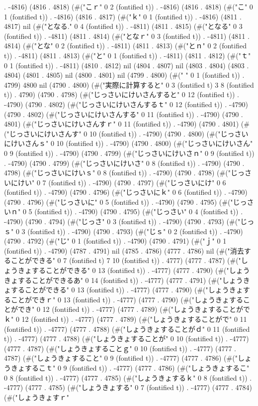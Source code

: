 . -4816) (4816 . 4818) (#("こｒ" 0 2 (fontified t)) . -4816) (4816 . 4818) (#("こ" 0 1 (fontified t)) . -4816) (4816 . 4817) (#("ｋ" 0 1 (fontified t)) . -4816) (4811 . 4817) nil (#("となる." 0 4 (fontified t)) . -4811) (4811 . 4815) (#("となる" 0 3 (fontified t)) . -4811) (4811 . 4814) (#("となｒ" 0 3 (fontified t)) . -4811) (4811 . 4814) (#("とな" 0 2 (fontified t)) . -4811) (4811 . 4813) (#("とｎ" 0 2 (fontified t)) . -4811) (4811 . 4813) (#("と" 0 1 (fontified t)) . -4811) (4811 . 4812) (#("ｔ" 0 1 (fontified t)) . -4811) (4810 . 4812) nil (4804 . 4807) nil (4803 . 4804) (4803 . 4804) (4801 . 4805) nil (4800 . 4801) nil (4799 . 4800) (#(" " 0 1 (fontified t)) . 4799) 4800 nil (4790 . 4800) (#("実際に計算すると" 0 3 (fontified t) 3 8 (fontified t)) . 4790) (4790 . 4798) (#("じっさいにけいさんすると" 0 12 (fontified t)) . -4790) (4790 . 4802) (#("じっさいにけいさんするｔ" 0 12 (fontified t)) . -4790) (4790 . 4802) (#("じっさいにけいさんする" 0 11 (fontified t)) . -4790) (4790 . 4801) (#("じっさいにけいさんすｒ" 0 11 (fontified t)) . -4790) (4790 . 4801) (#("じっさいにけいさんす" 0 10 (fontified t)) . -4790) (4790 . 4800) (#("じっさいにけいさんｓ" 0 10 (fontified t)) . -4790) (4790 . 4800) (#("じっさいにけいさん" 0 9 (fontified t)) . -4790) (4790 . 4799) (#("じっさいにけいさｎ" 0 9 (fontified t)) . -4790) (4790 . 4799) (#("じっさいにけいさ" 0 8 (fontified t)) . -4790) (4790 . 4798) (#("じっさいにけいｓ" 0 8 (fontified t)) . -4790) (4790 . 4798) (#("じっさいにけい" 0 7 (fontified t)) . -4790) (4790 . 4797) (#("じっさいにけ" 0 6 (fontified t)) . -4790) (4790 . 4796) (#("じっさいにｋ" 0 6 (fontified t)) . -4790) (4790 . 4796) (#("じっさいに" 0 5 (fontified t)) . -4790) (4790 . 4795) (#("じっさいｎ" 0 5 (fontified t)) . -4790) (4790 . 4795) (#("じっさい" 0 4 (fontified t)) . -4790) (4790 . 4794) (#("じっさ" 0 3 (fontified t)) . -4790) (4790 . 4793) (#("じっｓ" 0 3 (fontified t)) . -4790) (4790 . 4793) (#("じｓ" 0 2 (fontified t)) . -4790) (4790 . 4792) (#("じ" 0 1 (fontified t)) . -4790) (4790 . 4791) (#("ｊ" 0 1 (fontified t)) . -4790) (4787 . 4791) nil (4785 . 4786) (4777 . 4786) nil (#("消去することができる" 0 7 (fontified t) 7 10 (fontified t)) . 4777) (4777 . 4787) (#("しょうきょすることができる" 0 13 (fontified t)) . -4777) (4777 . 4790) (#("しょうきょすることができるあ" 0 14 (fontified t)) . -4777) (4777 . 4791) (#("しょうきょすることができる" 0 13 (fontified t)) . -4777) (4777 . 4790) (#("しょうきょすることができｒ" 0 13 (fontified t)) . -4777) (4777 . 4790) (#("しょうきょすることができ" 0 12 (fontified t)) . -4777) (4777 . 4789) (#("しょうきょすることがでｋ" 0 12 (fontified t)) . -4777) (4777 . 4789) (#("しょうきょすることがで" 0 11 (fontified t)) . -4777) (4777 . 4788) (#("しょうきょすることがｄ" 0 11 (fontified t)) . -4777) (4777 . 4788) (#("しょうきょすることが" 0 10 (fontified t)) . -4777) (4777 . 4787) (#("しょうきょすることｇ" 0 10 (fontified t)) . -4777) (4777 . 4787) (#("しょうきょすること" 0 9 (fontified t)) . -4777) (4777 . 4786) (#("しょうきょするこｔ" 0 9 (fontified t)) . -4777) (4777 . 4786) (#("しょうきょするこ" 0 8 (fontified t)) . -4777) (4777 . 4785) (#("しょうきょするｋ" 0 8 (fontified t)) . -4777) (4777 . 4785) (#("しょうきょする" 0 7 (fontified t)) . -4777) (4777 . 4784) (#("しょうきょすｒ" 